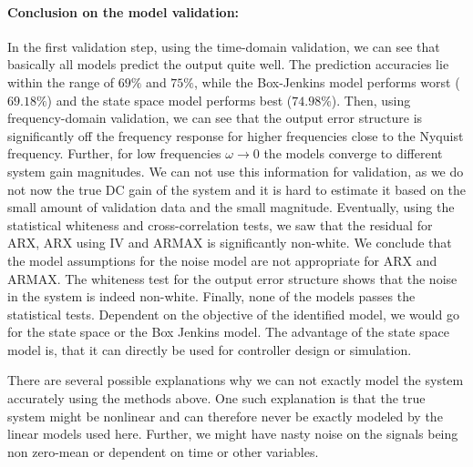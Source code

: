 \paragraph{Conclusion on the model validation: } In the first validation step, using the time-domain validation, we can see that basically all models predict the output quite well.
The prediction accuracies lie within the range of $69\%$ and $75\%$, while the Box-Jenkins model performs worst ($69.18\%$) and the state space model performs best ($74.98\%$).
Then, using frequency-domain validation, we can see that the output error structure is significantly off the frequency response for higher frequencies close to the Nyquist frequency.
Further, for low frequencies $\omega \rightarrow 0$ the models converge to different system gain magnitudes.
We can not use this information for validation, as we do not now the true DC gain of the system and it is hard to estimate it based on the small amount of validation data and the small magnitude.
Eventually, using the statistical whiteness and cross-correlation tests, we saw that the residual for ARX, ARX using IV and ARMAX is significantly non-white.
We conclude that the model assumptions for the noise model are not appropriate for ARX and ARMAX.
The whiteness test for the output error structure shows that the noise in the system is indeed non-white.
Finally, none of the models passes the statistical tests.
Dependent on the objective of the identified model, we would go for the state space or the Box Jenkins model.
The advantage of the state space model is, that it can directly be used for controller design or simulation.

There are several possible explanations why we can not exactly model the system accurately using the methods above.
One such explanation is that the true system might be nonlinear and can therefore never be exactly modeled by the linear models used here.
Further, we might have nasty noise on the signals being non zero-mean or dependent on time or other variables.




